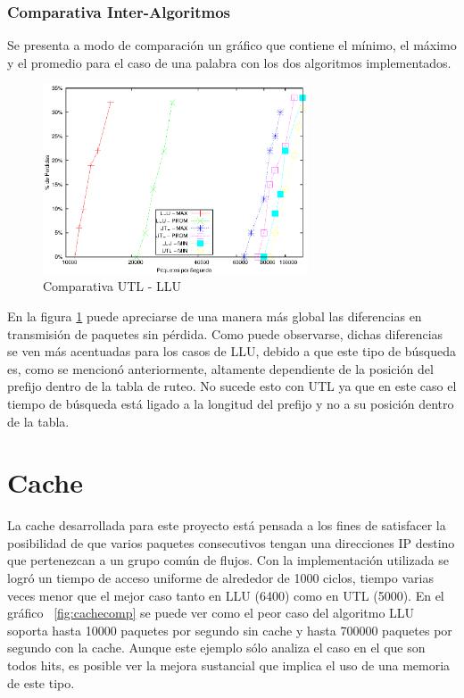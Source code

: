 \newpage
\subsubsection{Comparativa Inter-Algoritmos}
Se presenta a modo de comparación un gráfico que contiene el mínimo, el máximo y el promedio para el caso de una palabra con los dos algoritmos implementados. 
\begin{figure}[!h]
  \centering
	\includegraphics[width=0.7\textwidth]{5-resultados/graf/lluvsutl.eps}
  \caption{Comparativa UTL - LLU}
  \label{figvs}
\end{figure}

En la figura \ref{figvs} puede apreciarse de una manera más global las diferencias en transmisión de paquetes sin pérdida. Como puede observarse, dichas diferencias se ven más acentuadas para los casos de LLU, debido a que este tipo de búsqueda es, como se mencionó anteriormente, altamente dependiente de la posición del prefijo dentro de la tabla de ruteo. No sucede esto con UTL ya que en este caso el tiempo de búsqueda está ligado a la longitud del prefijo y no a su posición dentro de la tabla.


\section{Cache}

La cache desarrollada para este proyecto está pensada a los fines de satisfacer la posibilidad de que varios paquetes consecutivos tengan una direcciones IP destino que pertenezcan a un grupo común de flujos. Con la implementación utilizada se logró un tiempo de acceso uniforme de alrededor de 1000 ciclos, tiempo varias veces menor que el mejor caso tanto en LLU (6400) como en UTL (5000). En el gráfico ~\ref{fig:cachecomp} se puede ver como el peor caso del algoritmo LLU soporta hasta 10000 paquetes por segundo sin cache y hasta 700000 paquetes por segundo con la cache. Aunque este ejemplo sólo analiza el caso en el que son todos hits, es posible ver la mejora sustancial que implica el uso de una memoria de este tipo. 

